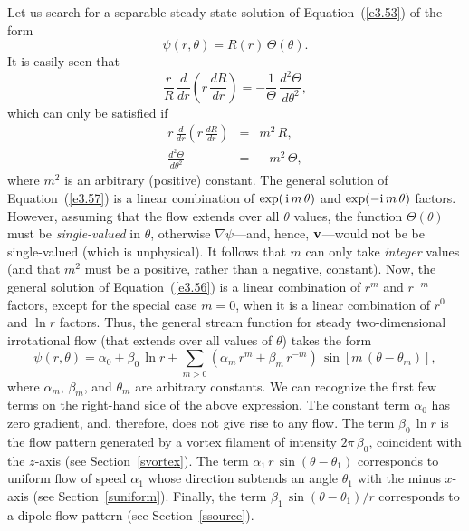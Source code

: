 Let us search for a separable steady-state solution of Equation~(\ref{e3.53}) of the form
\begin{equation}
\psi(r,\theta) = R(r)\,\Theta(\theta).
\end{equation}
It is easily seen that
\begin{equation}
\frac{r}{R}\,\frac{d}{dr}\!\left(r\,\frac{dR}{dr}\right)= - \frac{1}{\Theta}\,\frac{d^2\Theta}{d\theta^2},
\end{equation}
which can only be satisfied if
\begin{eqnarray}
r\,\frac{d}{dr}\!\left(r\,\frac{dR}{dr}\right)&=&m^2\,R,\label{e3.56}\\[0.5ex]
\frac{d^2\Theta}{d\theta^2} &=& -m^2\,\Theta,\label{e3.57}
\end{eqnarray}
where $m^2$ is an arbitrary (positive) constant. The general solution of Equation~(\ref{e3.57})
is a linear combination of $\exp(\,{\rm i}\,m\,\theta)$ and $\exp(-{\rm i}\,m\,\theta)$ factors.
However, assuming that the flow extends over all $\theta$ values, the function $\Theta(\theta)$ must be  {\em single-valued}\/ in $\theta$, otherwise $\nabla\psi$---and,
hence, ${\bf v}$---would not be be single-valued (which is unphysical).  It follows that $m$ can only take {\em integer}\/ values (and that $m^2$
must be a positive, rather than a negative, constant). 
Now, the general solution of Equation~(\ref{e3.56}) is a linear combination of $r^m$ and
$r^{-m}$ factors, except for the special case $m=0$, when it is a linear combination
of $r^0$ and $\ln r$ factors. Thus, the general stream function for steady two-dimensional
irrotational flow (that extends over all values of $\theta$) takes the form
\begin{equation}\label{e3.58y}
\psi(r,\theta) = \alpha_0+ \beta_0\,\ln r + \sum_{m>0} (\alpha_m\,r^m+\beta_m\,r^{-m})\,
\sin[m\,(\theta-\theta_m)],
\end{equation}
where $\alpha_m$, $\beta_m$, and $\theta_m$ are arbitrary constants. 
We can recognize the first few terms on the right-hand side of the above expression. The constant term $\alpha_0$
has zero gradient, and, therefore, does not give rise to any flow. The term $\beta_0\,\ln r$ is the flow pattern generated by 
a vortex filament of intensity $2\pi\,\beta_0$, coincident with the $z$-axis (see Section~\ref{svortex}). The
term $\alpha_1\,r\,\sin(\theta-\theta_1)$  corresponds to uniform flow of speed $\alpha_1$ whose
direction subtends an angle $\theta_1$ with the minus $x$-axis (see Section~\ref{suniform}).
Finally, the term $\beta_1\,\sin(\theta-\theta_1)/r$ corresponds to a dipole flow pattern (see Section~\ref{ssource}).

